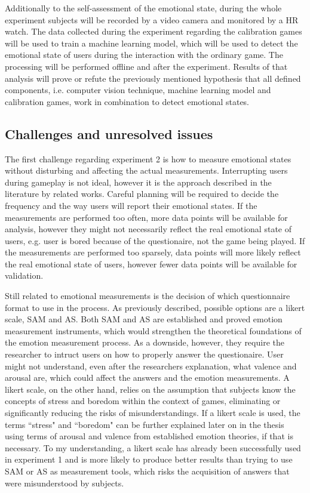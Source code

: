 Additionally to the self-assessment of the emotional state, during the whole experiment subjects will be recorded by a video camera and monitored by a HR watch. The data collected during the experiment regarding the calibration games will be used to train a machine learning model, which will be used to detect the emotional state of users during the interaction with the ordinary game. The processing will be performed offline and after the experiment. Results of that analysis will prove or refute the previously mentioned hypothesis that all defined components, i.e. computer vision technique, machine learning model and calibration games, work in combination to detect emotional states.

\subsection{Challenges and unresolved issues}
\label{experiment2-challenges}

The first challenge regarding experiment 2 is how to measure emotional states without disturbing and affecting the actual measurements. Interrupting users during gameplay is not ideal, however it is the approach described in the literature by related works. Careful planning will be required to decide the frequency and the way users will report their emotional states. If the measurements are performed too often, more data points will be available for analysis, however they might not necessarily reflect the real emotional state of users, e.g. user is bored because of the questionaire, not the game being played. If the measurements are performed too sparsely, data points will more likely reflect the real emotional state of users, however fewer data points will be available for validation.

Still related to emotional measurements is the decision of which questionnaire format to use in the process. As previously described, possible options are a likert scale, SAM and AS. Both SAM and AS are established and proved emotion measurement instruments, which would strengthen the theoretical foundations of the emotion measurement process. As a downside, however, they require the researcher to intruct users on how to properly answer the questionaire. User might not understand, even after the researchers explanation, what valence and arousal are, which could affect the answers and the emotion measurements. A likert scale, on the other hand, relies on the assumption that subjects know the concepts of stress and boredom within the context of games, eliminating or significantly reducing the risks of misunderstandings. If a likert scale is used, the terms ``stress" and ``boredom" can be further explained later on in the thesis using terms of arousal and valence from established emotion theories, if that is necessary. To my understanding, a likert scale has already been successfully used in experiment 1 and is more likely to produce better results than trying to use SAM or AS as measurement tools, which risks the acquisition of answers that were misunderstood by subjects.

